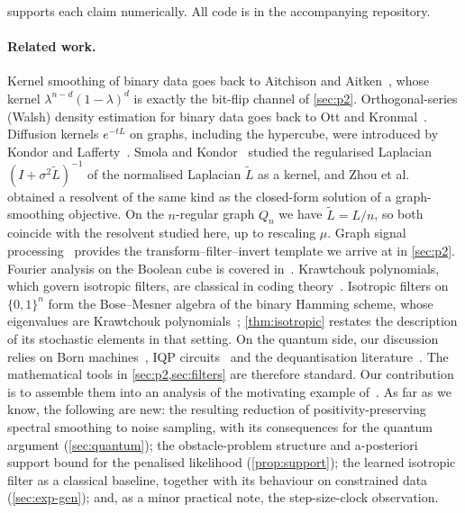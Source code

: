 \documentclass[11pt]{article}
\theoremstyle{definition}
\theoremstyle{remark}
\newcommand{\B}{\{0,1\}^n}
\begin{document}
 supports each claim numerically. All code is in the accompanying repository.

\paragraph{Related work.}
Kernel smoothing of binary data goes back to Aitchison and Aitken~\cite{aitchison1976binary}, whose kernel $\lambda^{n-d}(1-\lambda)^d$ is exactly the bit-flip channel of \cref{sec:p2}. Orthogonal-series (Walsh) density estimation for binary data goes back to Ott and Kronmal~\cite{ott1976binary}. Diffusion kernels $e^{-tL}$ on graphs, including the hypercube, were introduced by Kondor and Lafferty~\cite{kondor2002diffusion}. Smola and Kondor~\cite{smola2003kernels} studied the regularised Laplacian $(I+\sigma^2\tilde L)^{-1}$ of the normalised Laplacian $\tilde L$ as a kernel, and Zhou et al.~\cite{zhou2004consistency} obtained a resolvent of the same kind as the closed-form solution of a graph-smoothing objective. On the $n$-regular graph $Q_n$ we have $\tilde L=L/n$, so both coincide with the resolvent studied here, up to rescaling $\mu$. Graph signal processing~\cite{shuman2013graphsp} provides the transform--filter--invert template we arrive at in \cref{sec:p2}. Fourier analysis on the Boolean cube is covered in~\cite{odonnell2014boolean}. Krawtchouk polynomials, which govern isotropic filters, are classical in coding theory~\cite{macwilliams1977codes}. Isotropic filters on $\B$ form the Bose--Mesner algebra of the binary Hamming scheme, whose eigenvalues are Krawtchouk polynomials~\cite{delsarte1973algebraic}; \cref{thm:isotropic} restates the description of its stochastic elements in that setting. On the quantum side, our discussion relies on Born machines~\cite{liu2018qcbm,benedetti2019generative}, IQP circuits~\cite{shepherd2009iqp,bremner2011iqp,recio2025train} and the dequantisation literature~\cite{tang2019recommendation}. The mathematical tools in \cref{sec:p2,sec:filters} are therefore standard. Our contribution is to assemble them into an analysis of the motivating example of~\cite{belis2026spectral}. As far as we know, the following are new: the resulting reduction of positivity-preserving spectral smoothing to noise sampling, with its consequences for the quantum argument (\cref{sec:quantum}); the obstacle-problem structure and a-posteriori support bound for the penalised likelihood (\cref{prop:support}); the learned isotropic filter as a classical baseline, together with its behaviour on constrained data (\cref{sec:exp-gen}); and, as a minor practical note, the step-size-clock observation.
\end{document}
